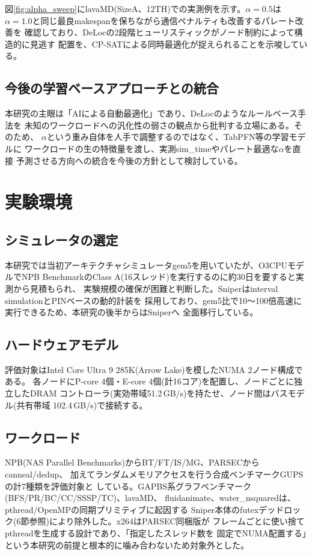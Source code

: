 \documentclass[a4paper]{article}
\begin{document}
図\ref{fig:alpha_sweep}にlavaMD(SizeA、12TH)での実測例を示す。$\alpha=0.5$は
$\alpha=1.0$と同じ最良makespanを保ちながら通信ペナルティも改善するパレート改善を
確認しており、DeLocの2段階ヒューリスティックがノード制約によって構造的に見逃す
配置を、CP-SATによる同時最適化が捉えられることを示唆している。

\subsection{今後の学習ベースアプローチとの統合}
本研究の主眼は「AIによる自動最適化」であり、DeLocのようなルールベース手法を
未知のワークロードへの汎化性の弱さの観点から批判する立場にある。そのため、
$\alpha$という重み自体を人手で調整するのではなく、TabPFN等の学習モデルに
ワークロードの生の特徴量を渡し、実測sim\_timeやパレート最適な$\alpha$を直接
予測させる方向への統合を今後の方針として検討している。

\section{実験環境}

\subsection{シミュレータの選定}
本研究では当初アーキテクチャシミュレータgem5を用いていたが、O3CPUモデルでNPB
BenchmarkのClass A(16スレッド)を実行するのに約30日を要すると実測から見積もられ、
実験規模の確保が困難と判断した。Sniperはinterval simulationとPINベースの動的計装を
採用しており、gem5比で10〜100倍高速に実行できるため、本研究の後半からはSniperへ
全面移行している。

\subsection{ハードウェアモデル}
評価対象はIntel Core Ultra 9 285K(Arrow Lake)を模したNUMA 2ノード構成である。
各ノードにP-core 4個・E-core 4個(計16コア)を配置し、ノードごとに独立したDRAM
コントローラ(実効帯域51.2\,GB/s)を持たせ、ノード間はバスモデル(共有帯域
102.4\,GB/s)で接続する。

\subsection{ワークロード}
NPB(NAS Parallel Benchmarks)からBT/FT/IS/MG、PARSECからcanneal/dedup、
加えてランダムメモリアクセスを行う合成ベンチマークGUPSの計7種類を評価対象と
している。GAPBS系グラフベンチマーク(BFS/PR/BC/CC/SSSP/TC)、lavaMD、
fluidanimate、water\_nsquaredは、pthread/OpenMPの同期プリミティブに起因する
Sniper本体のfutexデッドロック(6節参照)により除外した。x264はPARSEC同梱版が
フレームごとに使い捨てpthreadを生成する設計であり、「指定したスレッド数を
固定でNUMA配置する」という本研究の前提と根本的に噛み合わないため対象外とした。
\end{document}
